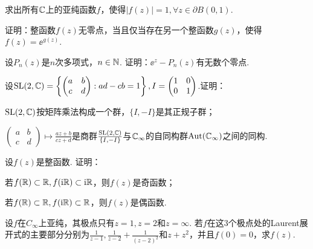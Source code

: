 \begin{xiti}
  \item 求出所有$\mathbb C$上的亚纯函数$f$，使得$|f(z)|=1,\forall z\in \partial B(0,1)$.
  \item 证明：整函数$f(z)$无零点，当且仅当存在另一个整函数$g(z)$，使得$f(z)=\ee^{g(z)}$.
  \item 设$P_n(z)$是$n$次多项式，$n\in\mathbb N$. 证明：$\ee^z-P_n(z)$有无数个零点.
  \item 设$\operatorname{SL}(2,\mathbb C)=\left\{\begin{pmatrix}
                           a & b \\
                           c & d
                           \end{pmatrix}:ad - cb = 1\right\},
                           I = \begin{pmatrix}
                           1 & 0 \\
                           0 & 1
                           \end{pmatrix}$.证明：
    \begin{enuma}
      \item $\operatorname{SL}(2,\mathbb C)$按矩阵乘法构成一个群，$\{ I,- I\}$是其正规子群；
      \item $\begin{pmatrix}
        a & b \\
        c & d
       \end{pmatrix}\mapsto\frac{az+b}{cz+d}$是商群$\frac{\operatorname{SL}(2,\mathbb C)}{\{ I,- I\}}$与$\mathbb C_\infty$的自同构群$\operatorname{Aut}(\mathbb C_\infty)$之间的同构.
    \end{enuma}
  \item 设$f(z)$是整函数. 证明：
    \begin{enuma}
      \item 若$f(\mathbb R)\subset \mathbb R,f(\mathrm i\mathbb R)\subset \mathrm i\mathbb R$，则$f(z)$是奇函数；
      \item 若$f(\mathbb R)\subset \mathbb R,f(\mathrm i\mathbb R)\subset \mathbb R$，则$f(z)$是偶函数.
    \end{enuma}
  \item 设$f$在$C_\infty$上亚纯，其极点只有$z=1,z=2$和$z=\infty$. 若$f$在这$3$个极点处的Laurent展开式的主要部分分别为$\frac1{z-1},\frac1{z-2}+\frac1{(z-2)^2}$和$z+z^2$，并且$f(0)=0$，求$f(z)$.
\end{xiti}

